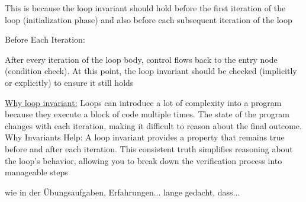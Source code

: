 \documentclass[landscape, a4paper]{article}
\begin{document}
\begin{minipage}[t]{0.2\linewidth}
\begin{betterlist}
\begin{betterlist}
\begin{betterlist}
				\item This is because the loop invariant should hold before the first iteration of the loop (initialization phase) and also before each subsequent iteration of the loop
			\end{betterlist}
			\item Before Each Iteration:
			\begin{betterlist}
				\item After every iteration of the loop body, control flows back to the entry node (condition check). At this point, the loop invariant should be checked (implicitly or explicitly) to ensure it still holds
			\end{betterlist}
		\end{betterlist}
		\item \underline{Why loop invariant:} Loops can introduce a lot of complexity into a program because they execute a block of code multiple times. The state of the program changes with each iteration, making it difficult to reason about the final outcome. Why Invariants Help: A loop invariant provides a property that remains true before and after each iteration. This consistent truth simplifies reasoning about the loop's behavior, allowing you to break down the verification process into manageable steps
    \item wie in der Übungsaufgaben, Erfahrungen... lange gedacht, dass...
	\end{betterlist}
\end{minipage}
\begin{minipage}[t]{0.2\linewidth}
\end{minipage}
\begin{minipage}[t]{0.2\linewidth}
\end{minipage}
\begin{minipage}[t]{0.2\linewidth}
\end{minipage}
\end{document}
